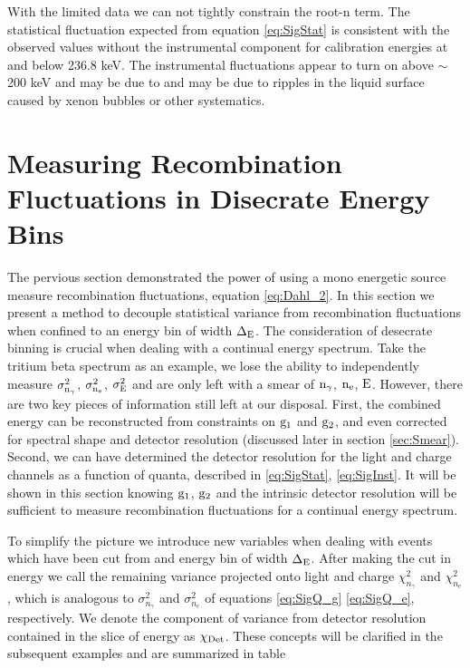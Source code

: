 \noindent With the limited data we can not tightly constrain the root-n term. The statistical fluctuation expected from equation \ref{eq:SigStat} is consistent with the observed values without the instrumental component for calibration energies at and below 236.8 keV. The instrumental fluctuations appear to turn on above $\sim$200 keV and may be due to and may be due to ripples in the liquid surface caused by xenon bubbles or other systematics. 


\section{Measuring Recombination Fluctuations in Disecrate Energy Bins}
\label{sec:flucs_mono_bins}

The pervious section demonstrated the power of using a mono energetic source measure recombination fluctuations, equation  \ref{eq:Dahl_2}. In this section we present a method to decouple statistical variance from recombination fluctuations when confined to an energy bin of width $\rm \Delta_E$. The consideration of desecrate binning is crucial when dealing with a continual energy spectrum. Take the tritium beta spectrum as an example, we lose the ability to independently measure $\rm \sigma_{n_\gamma}^2$, $\rm \sigma_{n_e}^2$, $\rm \sigma_{E}^2 $ and are only left with a smear of $\rm n_\gamma$, $\rm n_e$, $\rm E $. However, there are two key pieces of information still left at our disposal. First, the combined energy can be reconstructed from constraints on $\rm g_1$ and $\rm g_2$, and even corrected for spectral shape and detector resolution (discussed later in section \ref{sec:Smear}). Second, we can have determined the detector resolution for the light and charge channels as a function of quanta, described in \ref{eq:SigStat},  \ref{eq:SigInst}. It will be shown in this section knowing $\rm g_1$, $\rm g_2$ and the intrinsic detector resolution will be sufficient to measure recombination fluctuations for a continual energy spectrum. 

To simplify the picture we introduce new variables when dealing with events which have been cut from and energy bin of width $\rm \Delta_E$.  After making the cut in energy we call the remaining variance projected onto light and charge $\chi_{n_{\gamma}}^2$ and $\chi_{n_{e}}^2$, which is analogous to $\sigma_{n_{\gamma}}^2$ and $\sigma_{n_{e}}^2$ of equations \ref{eq:SigQ_g} \ref{eq:SigQ_e}, respectively. We denote the component of variance from detector resolution contained in the slice of energy as $\rm \chi_{Det}$. These concepts will be clarified in the subsequent examples and are summarized in table 

